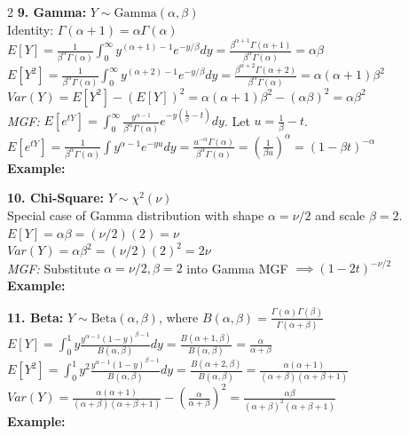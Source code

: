 \documentclass[10pt]{article}
\begin{document}
\begin{multicols*}{2}
\textbf{9. Gamma:} $Y \sim \text{Gamma}(\alpha, \beta)$\\
Identity: $\Gamma(\alpha+1) = \alpha\Gamma(\alpha)$\\
$E[Y] = \frac{1}{\beta^\alpha \Gamma(\alpha)} \int_{0}^{\infty} y^{(\alpha+1)-1} e^{-y/\beta} dy = \frac{\beta^{\alpha+1} \Gamma(\alpha+1)}{\beta^\alpha \Gamma(\alpha)} = \alpha\beta$\\
$E[Y^2] = \frac{1}{\beta^\alpha \Gamma(\alpha)} \int_{0}^{\infty} y^{(\alpha+2)-1} e^{-y/\beta} dy = \frac{\beta^{\alpha+2} \Gamma(\alpha+2)}{\beta^\alpha \Gamma(\alpha)} = \alpha(\alpha+1)\beta^2$\\
$Var(Y) = E[Y^2] - (E[Y])^2 = \alpha(\alpha+1)\beta^2 - (\alpha\beta)^2 = \alpha\beta^2$\\
\textit{MGF:} $E[e^{tY}] = \int_{0}^{\infty} \frac{y^{\alpha-1}}{\beta^\alpha \Gamma(\alpha)} e^{-y(\frac{1}{\beta}-t)} dy$. Let $u = \frac{1}{\beta}-t$.\\
$E[e^{tY}] = \frac{1}{\beta^\alpha \Gamma(\alpha)} \int y^{\alpha-1} e^{-yu} dy = \frac{u^{-\alpha} \Gamma(\alpha)}{\beta^\alpha \Gamma(\alpha)} = (\frac{1}{\beta u})^\alpha = (1-\beta t)^{-\alpha}$\\
\textbf{Example:} 
\vspace{1.2cm}

\textbf{10. Chi-Square:} $Y \sim \chi^2(\nu)$\\
Special case of Gamma distribution with shape $\alpha = \nu/2$ and scale $\beta = 2$.\\
$E[Y] = \alpha\beta = (\nu/2)(2) = \nu$\\
$Var(Y) = \alpha\beta^2 = (\nu/2)(2)^2 = 2\nu$\\
\textit{MGF:} Substitute $\alpha = \nu/2, \beta=2$ into Gamma MGF $\implies (1-2t)^{-\nu/2}$\\
\textbf{Example:} 
\vspace{1.2cm}

\textbf{11. Beta:} $Y \sim \text{Beta}(\alpha, \beta)$, where $B(\alpha, \beta) = \frac{\Gamma(\alpha)\Gamma(\beta)}{\Gamma(\alpha+\beta)}$\\
$E[Y] = \int_{0}^{1} y \frac{y^{\alpha-1} (1-y)^{\beta-1}}{B(\alpha, \beta)} dy = \frac{B(\alpha+1, \beta)}{B(\alpha, \beta)} = \frac{\alpha}{\alpha+\beta}$\\
$E[Y^2] = \int_{0}^{1} y^2 \frac{y^{\alpha-1} (1-y)^{\beta-1}}{B(\alpha, \beta)} dy = \frac{B(\alpha+2, \beta)}{B(\alpha, \beta)} = \frac{\alpha(\alpha+1)}{(\alpha+\beta)(\alpha+\beta+1)}$\\
$Var(Y) = \frac{\alpha(\alpha+1)}{(\alpha+\beta)(\alpha+\beta+1)} - \left(\frac{\alpha}{\alpha+\beta}\right)^2 = \frac{\alpha\beta}{(\alpha+\beta)^2(\alpha+\beta+1)}$\\
\textbf{Example:} 
\vspace{1.2cm}

\end{multicols*}
\end{document}
